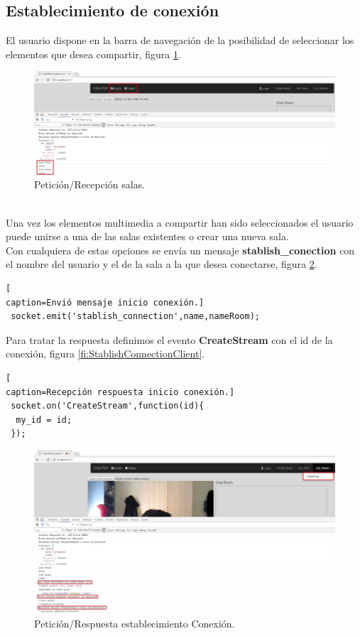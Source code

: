 \subsection*{Establecimiento de conexión}
 El usuario dispone en la barra de navegación de la posibilidad de seleccionar los elementos que desea compartir, figura \ref{fig:SelectItemsClient}.
\begin{figure}[!h]
\centering
\includegraphics[width=0.8\linewidth]{Figures/SelectItemsClient}
\decoRule
\caption[Petición/Recepción salas.]{Petición/Recepción salas.}
\label{fig:SelectItemsClient}
\end{figure}
\\Una vez los elementos multimedia a compartir han sido seleccionados el usuario puede unirse a una de las salas existentes o crear una nueva sala.
\\Con cualquiera de estas opciones se envía un mensaje \textbf{stablish\_conection} con el nombre del usuario y el de la sala a la que desea conectarse, figura \ref{fig:StablishConnectionClient}.
\begin{lstlisting}[
caption=Envió mensaje inicio conexión.]
 socket.emit('stablish_connection',name,nameRoom);
\end{lstlisting}
Para tratar la respuesta definimos el evento \textbf{CreateStream} con el id de la conexión, figura \ref{fi:StablishConnectionClient}.
\begin{lstlisting}[
caption=Recepción respuesta inicio conexión.]
 socket.on('CreateStream',function(id){
  my_id = id;
 });
\end{lstlisting}
\begin{figure}[!h]
\centering
\includegraphics[width=0.8\linewidth]{Figures/StablishConnectionClient}
\decoRule
\caption[Petición/Respuesta establecimiento Conexión.]{Petición/Respuesta establecimiento Conexión.}
\label{fig:StablishConnectionClient}
\end{figure}
